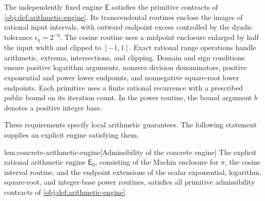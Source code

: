 \documentclass[11pt]{article}
\begin{document}
The independently fixed engine \(\mathsf E\) satisfies the primitive contracts of \cref{obj:def:arithmetic-engine}. Its transcendental routines enclose the images of rational input intervals, with outward endpoint excess controlled by the dyadic tolerance \(\epsilon_q=2^{-q}\). The cosine routine uses a midpoint enclosure enlarged by half the input width and clipped to \([-1,1]\). Exact rational range operations handle arithmetic, extrema, intersections, and clipping. Domain and sign conditions ensure positive logarithm arguments, nonzero division denominators, positive exponential and power lower endpoints, and nonnegative square-root lower endpoints. Each primitive uses a finite rational recurrence with a prescribed public bound on its iteration count. In the power routine, the bound argument \(b\) denotes a positive integer base.

These requirements specify local arithmetic guarantees. The following statement supplies an explicit engine satisfying them.

\begin{lemmav}{lem:concrete-arithmetic-engine}[Admissibility of the concrete engine]
The explicit rational arithmetic engine \(\mathsf E_0\), consisting of the Machin enclosure for \(\pi\), the cosine interval routine, and the endpoint extensions of the scalar exponential, logarithm, square-root, and integer-base power routines, satisfies all primitive admissibility contracts of \cref{obj:def:arithmetic-engine}.
\end{lemmav}
\end{document}

